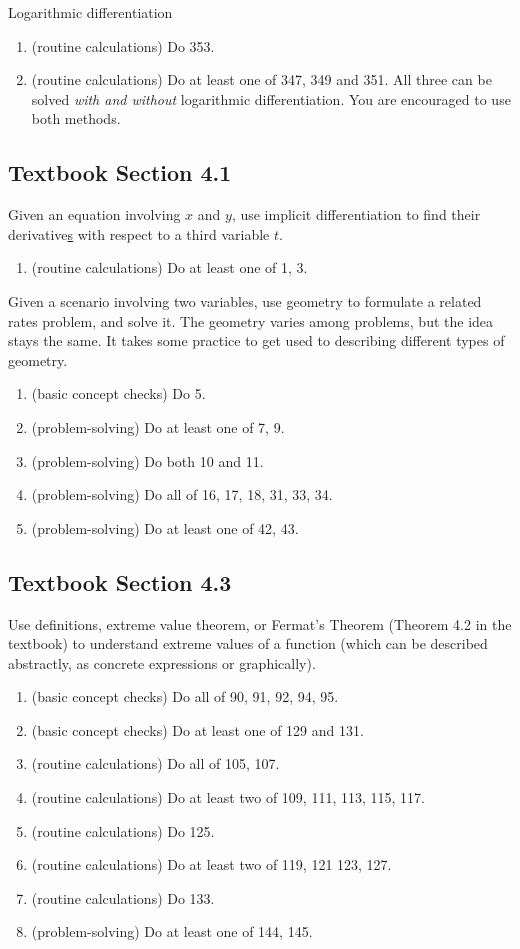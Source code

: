 \documentclass[../main.tex]{subfiles}
\begin{document}
Logarithmic differentiation
\begin{enumerate}
  \item (routine calculations) Do 353.
  \item (routine calculations) Do at least one of 347, 349 and 351. All three can be solved \emph{with and without} logarithmic differentiation. You are encouraged to use both methods.
\end{enumerate}

\subsection*{Textbook Section 4.1}

Given an equation involving \(x\) and \(y\), use implicit differentiation to find their derivative\underline{s} with respect to a third variable \(t\).
\begin{enumerate}
  \item (routine calculations) Do at least one of 1, 3.
\end{enumerate}

Given a scenario involving two variables, use geometry to formulate a related rates problem, and solve it.  The geometry varies among problems, but the idea stays the same. It takes some practice to get used to describing different types of geometry.
\begin{enumerate}
  \item (basic concept checks) Do 5.
  \item (problem-solving) Do at least one of 7, 9.
  \item (problem-solving) Do both 10 and 11.
  \item (problem-solving) Do all of 16, 17, 18, 31, 33, 34.
  \item (problem-solving) Do at least one of 42, 43.
\end{enumerate}
\clearpage

\subsection*{Textbook Section 4.3}

Use definitions, extreme value theorem, or Fermat's Theorem (Theorem 4.2 in the textbook) to understand extreme values of a function (which can be described abstractly, as concrete expressions or graphically).
\begin{enumerate}
  \item (basic concept checks) Do all of 90, 91, 92, 94, 95.
  \item (basic concept checks) Do at least one of 129 and 131.
  \item (routine calculations) Do all of 105, 107.
  \item (routine calculations) Do at least two of 109, 111, 113, 115, 117.
  \item (routine calculations) Do 125.
  \item (routine calculations) Do at least two of 119, 121 123, 127.
  \item (routine calculations) Do 133.
  \item (problem-solving) Do at least one of 144, 145.
\end{enumerate}
\end{document}
